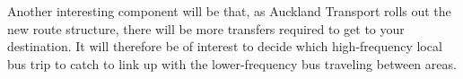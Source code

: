 \documentclass[12pt,a4paper]{article}
\begin{document}
Another interesting component will be that, as Auckland Transport rolls out the new
route structure, there will be more transfers required to get to your destination.
It will therefore be of interest to decide which high-frequency local bus trip to catch
to link up with the lower-frequency bus traveling between areas.





















\end{document}
